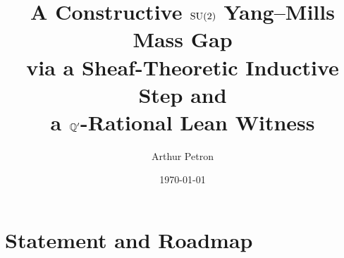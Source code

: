 \documentclass[wide-notes]{arthur-book}
\title{A Constructive $\mathrm{SU}(2)$ Yang--Mills Mass Gap\\[0.25em]
  \large via a Sheaf-Theoretic Inductive Step and\\
  a $\mathbb{Q}'$-Rational Lean Witness}
\author{Arthur Petron}
\date{\today}
\begin{document}
\maketitle

\frontmatter


\tableofcontents

\mainmatter

\part{Statement and Roadmap}



\end{document}
